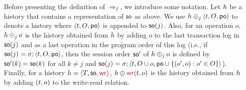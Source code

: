 Before presenting the definition of $\Rightarrow_I$, we introduce some notation. Let ${h}$ be a history that contains a representation of $\mathsf{so}$ as above. We use ${h}\oplus_j {\left\langle{{t},O,\mathsf{po}}\right\rangle}$ to denote a history where ${\left\langle{{t},O,\mathsf{po}}\right\rangle}$ is appended to $\mathsf{so}(j)$. 
Also, for an operation $o$, ${h}\oplus_j o$ is the history obtained from ${h}$ by adding $o$ to the last transaction log in $\mathsf{so}(j)$ and as a last operation in the program order of this log (i.e.,  if $\mathsf{so}(j)=\sigma; {\left\langle{t,O,\mathsf{po}}\right\rangle}$, then the session order $\mathsf{so}'$ of ${h}\oplus_j o$ is defined by $\mathsf{so}'(k)=\mathsf{so}(k)$ for all $k\neq j$ and $\mathsf{so}(j) =\sigma; {\left\langle{t,O\cup{o},\mathsf{po}\cup \{(o',o): o'\in O\}}\right\rangle}$). Finally, for a history ${h} = {\left\langle{T, \mathsf{so}, \textcolor{red}{\mathsf{wr}_{}}}\right\rangle}$, ${h}\oplus\textcolor{red}{\mathsf{wr}_{}}({t},o)$ is the history obtained from ${h}$ by adding $({t},o)$ to the write-read relation.

